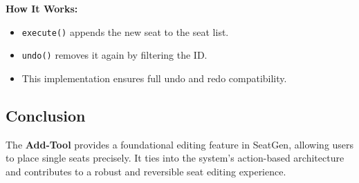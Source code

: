 \textbf{How It Works:}
\begin{itemize}
    \item \texttt{execute()} appends the new seat to the seat list.
    \item \texttt{undo()} removes it again by filtering the ID.
    \item This implementation ensures full undo and redo compatibility.
\end{itemize}

\subsection{Conclusion}
The \textbf{Add-Tool} provides a foundational editing feature in SeatGen, allowing users to place single seats precisely. It ties into the system's action-based architecture and contributes to a robust and reversible seat editing experience.

